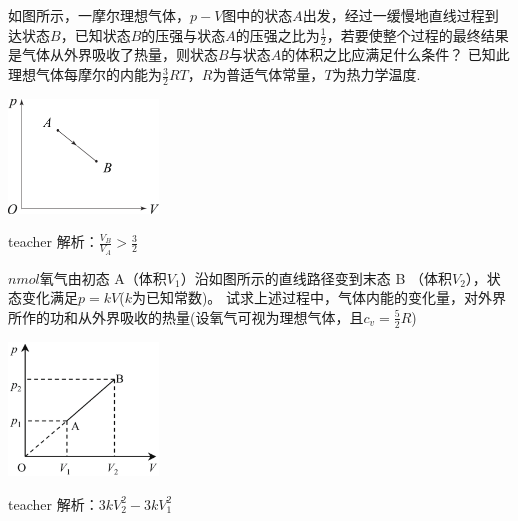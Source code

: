 \begin{example}
	如图所示，一摩尔理想气体，$p-V$图中的状态$ A$出发，经过一缓慢地直线过程到达状态$ B$，已知状态$ B $的压强与状态$ A $的压强之比为$\frac{1}{2}$，若要使整个过程的最终结果是气体从外界吸收了热量，则状态$B $与状态$A $的体积之比应满足什么条件？
	已知此理想气体每摩尔的内能为$ \frac{3}{2}RT $，$R$为普适气体常量，$T$为热力学温度.
		\begin{flushright}
			\includegraphics[width = 0.3\textwidth]{images/thermal-7.pdf} 
		\end{flushright}
	\begin{taggedblock}{teacher}
		\noindent
		解析：$\frac{V_B}{V_A}>\frac{3}{2}$
	\end{taggedblock}
\end{example}

\begin{example}
	$n\si{mol}$氧气由初态 A（体积$ V_1$）沿如图所示的直线路径变到末态 B （体积$V_2$），状态变化满足$p=kV$($k$为已知常数)。
	试求上述过程中，气体内能的变化量，对外界所作的功和从外界吸收的热量(设氧气可视为理想气体，且$c_v =\frac{5}{2}R$)
		\begin{flushright}
			\includegraphics[width = 0.3\textwidth]{images/thermal-11.pdf} 
		\end{flushright}
	\begin{taggedblock}{teacher}
		\noindent
		解析：$3kV_2^2-3kV_1^2$
	\end{taggedblock}
\end{example}

